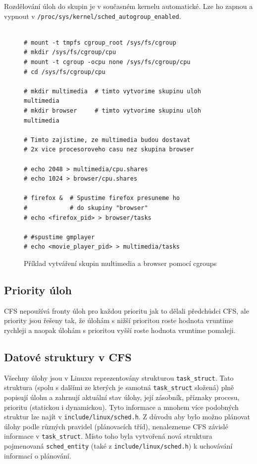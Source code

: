 \documentclass[
  field=ainfk,
  biblatex,
  glossaries,
  index
]{kidiplom}
\begin{document}
Rozdělování úloh do skupin je v současném kernelu automatické. Lze ho zapnou a vypnout v \verb#/proc/sys/kernel/sched_autogroup_enabled#.

\newpage

\begin{figure}[ht]
\caption{Příklad vytváření skupin multimedia a browser pomocí cgroups}
\center
\label{cgroups}

\begin{Verbatim}[frame=single]

# mount -t tmpfs cgroup_root /sys/fs/cgroup
# mkdir /sys/fs/cgroup/cpu
# mount -t cgroup -ocpu none /sys/fs/cgroup/cpu
# cd /sys/fs/cgroup/cpu

# mkdir multimedia  # timto vytvorime skupinu uloh multimedia 
# mkdir browser     # timto vytvorime skupinu uloh multimedia 

# Timto zajistime, ze multimedia budou dostavat 
# 2x vice procesoroveho casu nez skupina browser

# echo 2048 > multimedia/cpu.shares
# echo 1024 > browser/cpu.shares

# firefox &  # Spustime firefox presuneme ho
#            # do skupiny "browser"
# echo <firefox_pid> > browser/tasks

# #spustime gmplayer
# echo <movie_player_pid> > multimedia/tasks

\end{Verbatim}
\end{figure}

\subsection{Priority úloh}

CFS nepoužívá fronty úloh pro každou prioritu jak to dělali předchůdci CFS, ale priority jsou řešeny tak, že úlohám s nižší prioritou roste hodnota vruntime rychleji a naopak úlohám s prioritou vyšší roste hodnota vruntime pomaleji.

\subsection{Datové struktury v CFS}

Všechny úlohy jsou v Linuxu reprezentovány strukturou \verb#task_struct#. Tato struktura (spolu s dalšími ze kterých je samotná \verb#task_struct# složená) plně popisují úlohu a zahrnují aktuální stav úlohy, její zásobník, příznaky procesu, prioritu (statickou i dynamickou). Tyto informace a mnohem více podobných struktur lze najít v \verb#include/linux/sched.h#. Z důvodu aby bylo možno plánovat úlohy podle různých pravidel (plánovacích tříd), nenalezneme CFS závislé informace v \verb#task_struct#. Místo toho byla vytvořená nová struktura pojmenovaná \verb#sched_entity# (také z \verb#include/linux/sched.h#) k uchovávání informací o plánování.
\end{document}
